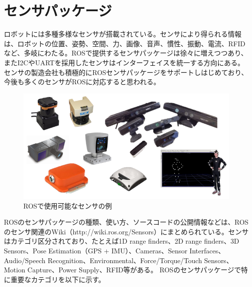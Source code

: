 \section{センサパッケージ}

ロボットには多種多様なセンサが搭載されている。センサにより得られる情報は、ロボットの位置、姿勢、空間、力、画像、音声、慣性、振動、電流、RFIDなど、多岐にわたる。ROSで提供するセンサパッケージは徐々に増えつつあり、またI2CやUARTを採用したセンサはインターフェイスを統一する方向にある。センサの製造会社も積極的にROSセンサパッケージをサポートしはじめており、今後も多くのセンサがROSに対応すると思われる。

\begin{figure}[htp]
  \centering
  \includegraphics[width=15cm]{pictures/chapter7/pic_07_03.png}
  \caption{ROSで使用可能なセンサの例}
\end{figure}

ROSのセンサパッケージの種類、使い方、ソースコードの公開情報などは、ROSのセンサ関連のWiki（http://wiki.ros.org/Sensors）にまとめられている。センサはカテゴリ区分されており、たとえば1D range finders、2D range finders、3D Sensors、Pose Estimation（GPS + IMU）、Cameras、Sensor Interfaces、Audio/Speech Recognition、Environmental、Force/Torque/Touch Sensors、Motion Capture、Power Supply、RFID等がある。
 ROSのセンサパッケージで特に重要なカテゴリを以下に示す。

